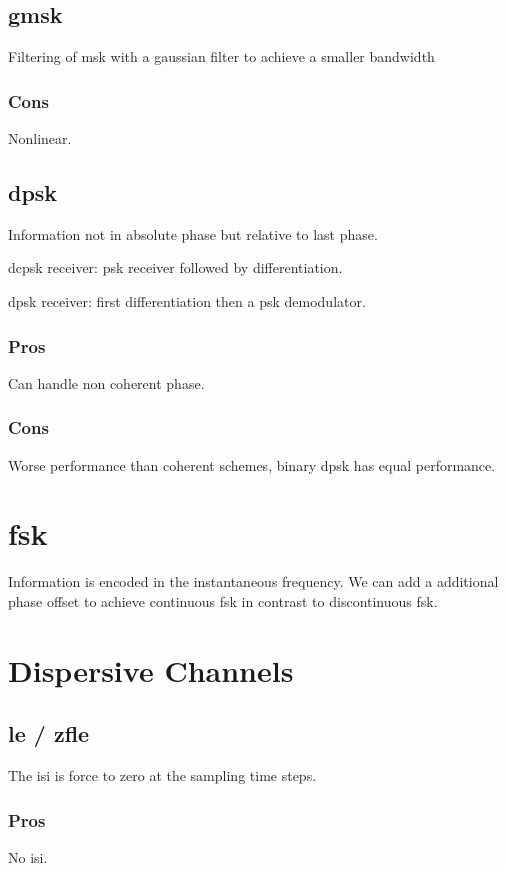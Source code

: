 \subsection{\acl{gmsk}}
Filtering of \ac{msk} with a gaussian filter to achieve a smaller bandwidth

\subsubsection{Cons}
Nonlinear.

\subsection{\acl{dpsk}}
Information not in absolute phase but relative to last phase.

\ac{dcpsk} receiver: \ac{psk} receiver followed by differentiation.

\ac{dpsk} receiver: first differentiation then a \ac{psk} demodulator.

\subsubsection{Pros}
Can handle non coherent phase.

\subsubsection{Cons}
Worse performance than coherent schemes, binary \ac{dpsk} has equal performance.

\section{\acl{fsk}}
Information is encoded in the instantaneous frequency. We can add a additional phase offset
to achieve continuous \ac{fsk} in contrast to discontinuous \ac{fsk}.

\section{Dispersive Channels}
\subsection{\acl{le} / \acl{zfle}}
The \ac{isi} is force to zero at the sampling time steps.

\subsubsection{Pros}
No \ac{isi}.

